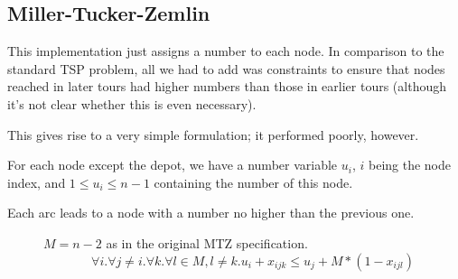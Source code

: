 \subsection{Miller-Tucker-Zemlin}

This implementation just assigns a number to each node. In comparison to the standard TSP problem, all we had to add was constraints to ensure that nodes reached in later tours had higher numbers than those in earlier tours (although it's not clear whether this is even necessary).

This gives rise to a very simple formulation; it performed poorly, however.

For each node except the depot, we have a number variable $u_i$, $i$ being the node index, and $1 \leq u_i \leq n-1$ containing the number of this node.

\begin{description}
 \item[Each arc leads to a node with a number no higher than the previous one.] $M=n-2$ as in the original MTZ specification.
 \begin{equation}
        \forall i. \forall j \neq i. \forall k. \forall l \in M, l \neq k. 
               u_{i} + x_{ijk} \leq u_j + M * (1 - x_{ijl})
 \end{equation}  
  
\end{description}

